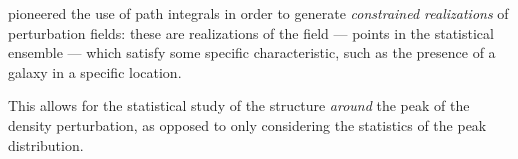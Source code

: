 \documentclass[main.tex]{subfiles}
\begin{document}


\textcite[]{bertschingerPathIntegralMethods1987} pioneered the use of path integrals in order to generate \emph{constrained realizations} of perturbation fields: these are realizations of the field --- points in the statistical ensemble --- which satisfy some specific characteristic, such as the presence of a galaxy in a specific location. 

This allows for the statistical study of the structure \emph{around} the peak of the density perturbation, as opposed to only considering the statistics of the peak distribution. 







\end{document}
